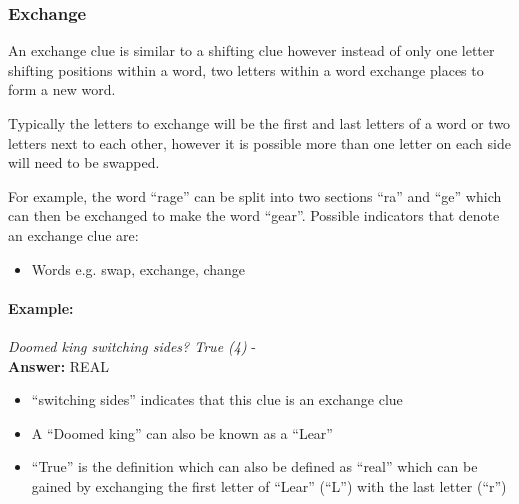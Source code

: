 \subsubsection{Exchange}

An exchange clue is similar to a shifting clue however instead of only one
letter shifting positions within a word, two letters within a word exchange
places to form a new word.

Typically the letters to exchange will be the first and last letters of a word
or two letters next to each other, however it is possible more than one letter
on each side will need to be swapped. 

For example, the word ``rage'' can be split into two sections ``ra'' and ``ge''
which can then be exchanged to make the word ``gear''. Possible  indicators that
denote an exchange clue are:

\begin{itemize} 
    \item Words e.g. swap, exchange, change 
\end{itemize}

\paragraph{Example:} \emph{Doomed king switching sides? True (4)} - \citep{shuchiExchange09} \\
\textbf{Answer:} REAL 

\begin{itemize}
    \item ``switching sides'' indicates that this clue is an exchange clue 
    \item A ``Doomed king'' can also be known as a ``Lear''
    \item ``True'' is the definition which can also be defined as ``real'' 
    which can be gained by exchanging the first letter of ``Lear'' (``L'') with
    the last letter (``r'') 
\end{itemize}